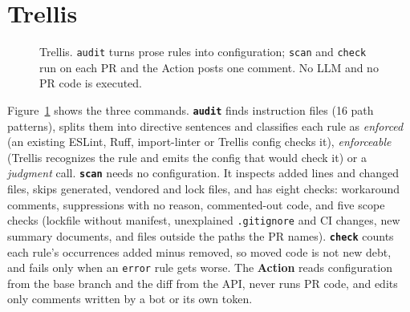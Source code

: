 \documentclass[sigconf]{acmart}
\begin{document}
\section{Trellis}\label{sec:tool}
\begin{figure}[t]\centering\footnotesize
{}
\caption{Trellis. \texttt{audit} turns prose rules into configuration; \texttt{scan} and \texttt{check} run on each PR and the Action posts one comment. No LLM and no PR code is executed.}\label{fig:arch}
\end{figure}
Figure~\ref{fig:arch} shows the three commands. \textbf{\texttt{audit}} finds instruction files (16 path patterns), splits them into directive sentences and classifies each rule as \emph{enforced} (an existing ESLint, Ruff, import-linter or Trellis config checks it), \emph{enforceable} (Trellis recognizes the rule and emits the config that would check it) or a \emph{judgment} call. \textbf{\texttt{scan}} needs no configuration. It inspects added lines and changed files, skips generated, vendored and lock files, and has eight checks: workaround comments, suppressions with no reason, commented-out code, and five scope checks (lockfile without manifest, unexplained \texttt{.gitignore} and CI changes, new summary documents, and files outside the paths the PR names). \textbf{\texttt{check}} counts each rule's occurrences added minus removed, so moved code is not new debt, and fails only when an \texttt{error} rule gets worse. The \textbf{Action} reads configuration from the base branch and the diff from the API, never runs PR code, and edits only comments written by a bot or its own token.
\end{document}
